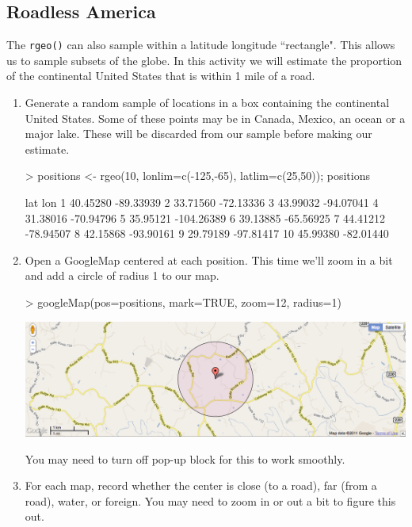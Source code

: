 \subsection{Roadless America}

The \verb!rgeo()! can also sample within a latitude longitude ``rectangle".
This allows us to sample subsets of the globe.  In this activity we will estimate 
the proportion of the continental United States that is within 1 mile of a road.

\begin{enumerate}
\item
Generate a random sample of locations in a box containing the continental United States.
Some of these points may be in Canada, Mexico, an ocean or a major lake.  These 
will be discarded from our sample before making our estimate.
\begin{Schunk}
\begin{Sinput}
> positions <- rgeo(10, lonlim=c(-125,-65), latlim=c(25,50)); positions
\end{Sinput}
\begin{Soutput}
        lat        lon
1  40.45280  -89.33939
2  33.71560  -72.13336
3  43.99032  -94.07041
4  31.38016  -70.94796
5  35.95121 -104.26389
6  39.13885  -65.56925
7  44.41212  -78.94507
8  42.15868  -93.90161
9  29.79189  -97.81417
10 45.99380  -82.01440
\end{Soutput}
\end{Schunk}

\item
Open a GoogleMap centered at each position.  This time we'll zoom in a bit and add 
a circle of radius 1 to our map.

\begin{Schunk}
\begin{Sinput}
> googleMap(pos=positions, mark=TRUE, zoom=12, radius=1)
\end{Sinput}
\end{Schunk}


\begin{center}
\includegraphics[width=.8\textwidth]{images/google-roadless}
\end{center}
You may need to turn off pop-up block for this to work smoothly.
\item
For each map, record whether the center is close (to a road), far (from a road), water, or foreign.
You may need to zoom in or out a bit to figure this out.

\end{enumerate}

